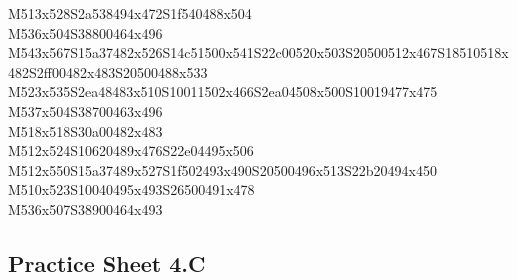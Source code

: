 \documentclass{article}
\begin{document}
\begin{multicols}{5}
\begin{center}
M513x528S2a538494x472S1f540488x504 %
\\M536x504S38800464x496 %
\\M543x567S15a37482x526S14c51500x541S22c00520x503S20500512x467S18510518x482S2ff00482x483S20500488x533 %
\\M523x535S2ea48483x510S10011502x466S2ea04508x500S10019477x475 %
\\M537x504S38700463x496 %
\\M518x518S30a00482x483 %
\\M512x524S10620489x476S22e04495x506 %
\\M512x550S15a37489x527S1f502493x490S20500496x513S22b20494x450 %
\\M510x523S10040495x493S26500491x478 %
\\M536x507S38900464x493 %
\vfil

\end{center}
\end{multicols}

\subsection{Practice Sheet 4.C}
\end{document}
